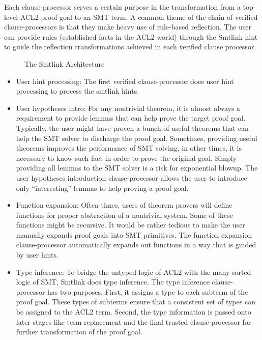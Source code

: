 Each clause-processor serves a certain purpose in the transformation from a
top-level ACL2 proof goal to an SMT term.
A common theme of the chain of verified clause-processors is that they make
heavy use of rule-based reflection. The user can provide rules (established
facts in the ACL2 world) through the Smtlink hint to guide the reflection
transformations achieved in each verified clause processor.

\begin{figure}\begin{center}
  \resizebox{1.0\textwidth}{!}{}
  \caption{The Smtlink Architecture}\label{fig:arch}
\end{center}\end{figure}

\begin{itemize}
\item User hint processing: The first verified
  clause-processor does user hint processing to process the smtlink hints.
  \item User hypotheses intro: For any nontrivial theorem, it is almost always a requirement to provide lemmas
    that can help prove the target proof goal. Typically, the user might have proven
    a bunch of useful theorems that can help the SMT solver to discharge the proof
    goal. Sometimes, providing useful theorems improves the performance of SMT
    solving, in other times, it is necessary to know such fact in order to prove the
    original goal. Simply providing all lemmas to the SMT solver is a risk for
    exponential blowup. The user hypotheses introduction clause-processor allows the
    user to introduce only ``interesting'' lemmas to help proving a proof goal.

  \item Function expansion: Often times, users of theorem provers will define functions for proper
    abstraction of a nontrivial system. Some of these functions might be recursive.
    It would be rather tedious to make the user manually expands proof goals into
    SMT primitives. The function expansion clause-processor automatically expands
    out functions in a way that is guided by user hints.

  \item Type inference: To bridge the untyped logic of ACL2 with the many-sorted logic of SMT, Smtlink
    does type inference. The type inference clause-processor has two purposes.
    First, it assigns a type to each subterm of the proof goal. These types of
    subterms ensure that a consistent set of types can be assigned to the ACL2 term.
    Second, the type information is passed onto later stages like term replacement
    and the final trusted clause-processor for further transformation of the proof
    goal.


\end{itemize}
